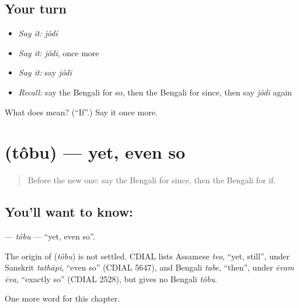 \subsection*{Your turn}
\begin{itemize}
\raggedright
  \item \emph{Say it:} \emph{jôdi}
  \item \emph{Say it:} \emph{jôdi}, once more
  \item \emph{Say it:} say \emph{jôdi}
  \item \emph{Recall:} say the Bengali for so, then the Bengali for since, then say \emph{jôdi} again
\end{itemize}

\begin{tcolorbox}[breakable,colback=teal!4,colframe=teal!35!black,title={Before you move on}]
What does  mean? (\textquotedblleft{}If\textquotedblright{}.) Say it once more.
\end{tcolorbox}
\section[\texorpdfstring{\bn{তবু} (tôbu)}{তবু (tôbu)}]{ (tôbu) — yet, even so}

\label{lesson:BN-C159-tobu}



\begin{quote}
Before the new one: say the Bengali for since, then the Bengali for if.
\end{quote}

\subsection*{You'll want to know: }
\textbf{} — \emph{tôbu} — \textquotedblleft{}yet, even so\textquotedblright{}.

\begin{cousinweb}
The origin of \textbf{} (\emph{tôbu}) is not settled. CDIAL lists Assamese \emph{teo}, \textquotedblleft{}yet, still\textquotedblright{}, under Sanskrit \emph{tathāpi}, \textquotedblleft{}even so\textquotedblright{} (CDIAL 5647), and Bengali \emph{tabe}, \textquotedblleft{}then\textquotedblright{}, under \emph{ēvam ēva}, \textquotedblleft{}exactly so\textquotedblright{} (CDIAL 2528), but gives no Bengali \emph{tôbu}.
\end{cousinweb}

\begin{grammarlens}[title={What you've built}]
One more word for this chapter.
\end{grammarlens}

